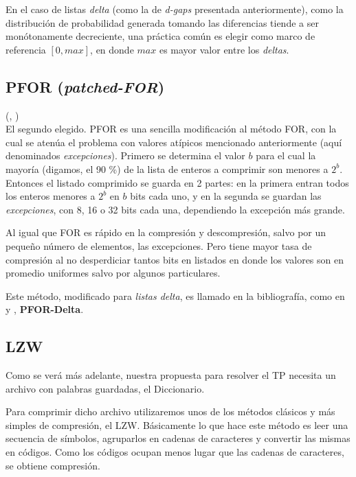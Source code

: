 En el caso de listas \textit{delta} (como la de \textit{d-gaps} presentada anteriormente), como la distribución de probabilidad generada tomando las diferencias tiende a ser monótonamente decreciente, una práctica común es elegir como marco de referencia $[0, max]$, en donde $max$ es mayor valor entre los \textit{deltas}. 


\subsection{PFOR (\textit{patched-FOR})}

(\noindent \citeauthor{Zukowski:2006}, \citeyear{Zukowski:2006})
\\

El segundo elegido. PFOR es una sencilla modificación al método FOR, con la cual se atenúa el problema con valores atípicos mencionado anteriormente (aquí denominados \textit{excepciones}). Primero se determina el valor $b$ para el cual la mayoría (digamos, el 90 \%) de la lista de enteros a comprimir son menores a $2^b$. Entonces el listado comprimido se guarda en 2 partes: en la primera entran todos los enteros menores a $2^b$ en $b$ bits cada uno, y en la segunda se guardan las \textit{excepciones}, con 8, 16 o 32 bits cada una, dependiendo la excepción más grande.

Al igual que FOR es rápido en la compresión y descompresión, salvo por un pequeño número de elementos, las excepciones. Pero tiene mayor tasa de compresión al no desperdiciar tantos bits en listados en donde los valores son en promedio uniformes salvo por algunos particulares.

Este método, modificado para \textit{listas delta}, es llamado en la bibliografía, como en \cite{Zhang:2008} y \cite{Zukowski:2006}, \textbf{PFOR-Delta}.


\subsection{LZW}

Como se verá más adelante, nuestra propuesta para resolver el TP necesita un archivo con palabras guardadas, el Diccionario. 

Para comprimir dicho archivo utilizaremos unos de los métodos clásicos y más simples de compresión, el LZW. Básicamente lo que hace este método es leer una secuencia de símbolos, agruparlos en cadenas de caracteres y convertir las mismas en códigos. Como los códigos ocupan menos lugar que las cadenas de caracteres, se obtiene compresión.

